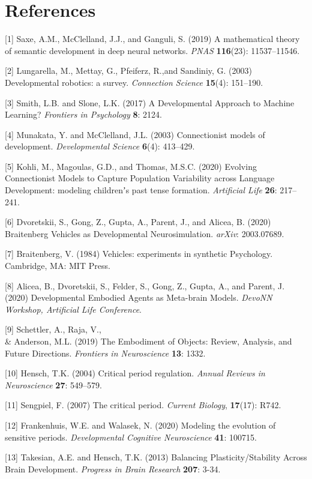 \documentclass{article}
\begin{document}
\section*{References}
\medskip
\small
[1] Saxe, A.M., McClelland, J.J., and Ganguli, S. (2019) A mathematical theory of semantic development in deep neural networks. {\it PNAS} {\bf 116}(23): 11537–11546.

[2] Lungarella, M., Mettay, G., Pfeiferz, R.,and Sandiniy, G. (2003) Developmental robotics: a survey. {\it Connection Science} {\bf 15}(4): 151–190.

[3] Smith, L.B. and Slone, L.K. (2017) A Developmental Approach to Machine Learning? {\it Frontiers in Psychology} {\bf 8}: 2124.

[4] Munakata, Y. and  McClelland, J.L. (2003) Connectionist models of development. {\it Developmental Science} {\bf 6}(4): 413–429.

[5] Kohli, M., Magoulas, G.D., and Thomas, M.S.C. (2020) Evolving Connectionist Models to Capture Population Variability across Language Development: modeling childrenʼs past tense formation. {\it Artificial Life} {\bf 26}: 217–241.

[6] Dvoretskii, S., Gong, Z., Gupta, A., Parent, J., and Alicea, B. (2020) Braitenberg Vehicles as Developmental Neurosimulation. {\it arXiv}: 2003.07689.

[7] Braitenberg, V. (1984) Vehicles: experiments in synthetic Psychology. Cambridge, MA: MIT Press.

[8] Alicea, B., Dvoretskii, S., Felder, S., Gong, Z., Gupta, A., and Parent, J. (2020) Developmental Embodied Agents as Meta-brain Models. {\it DevoNN Workshop, Artificial Life Conference}.

[9] Schettler, A., Raja, V., \\& Anderson, M.L. (2019) The Embodiment of Objects: Review, Analysis, and Future Directions. {\it Frontiers in Neuroscience} {\bf 13}: 1332.

[10] Hensch, T.K. (2004)  Critical period regulation. {\it Annual Reviews in Neuroscience} {\bf 27}: 549–579.

[11] Sengpiel, F. (2007) The critical period. {\it Current Biology}, {\bf 17}(17): R742.

[12] Frankenhuis, W.E. and Walasek, N. (2020) Modeling the evolution of sensitive periods. {\it Developmental Cognitive Neuroscience} {\bf 41}: 100715.

[13] Takesian, A.E. and Hensch, T.K. (2013) Balancing Plasticity/Stability Across Brain Development. {\it Progress in Brain Research} {\bf 207}: 3-34.
\end{document}
